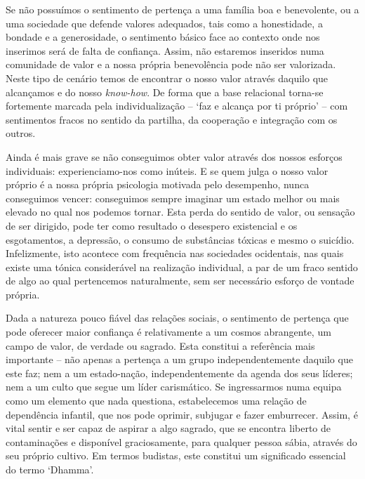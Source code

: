 Se não possuímos o sentimento de pertença a uma família boa e benevolente, ou a uma sociedade que defende valores adequados, tais como a honestidade, a bondade e a generosidade, o sentimento básico face ao contexto onde nos inserimos será de falta de confiança. Assim, não estaremos inseridos numa comunidade de valor e a nossa própria benevolência pode não ser valorizada. Neste tipo de cenário temos de encontrar o nosso valor através daquilo que alcançamos e do nosso \emph{know-how}. De forma que a base relacional torna-se fortemente marcada pela individualização -- `faz e alcança por ti próprio' -- com sentimentos fracos no sentido da partilha, da cooperação e integração com os outros.

Ainda é mais grave se não conseguimos obter valor através dos nossos esforços individuais: experienciamo-nos como inúteis. E se quem julga o nosso valor próprio é a nossa própria psicologia motivada pelo desempenho, nunca conseguimos vencer: conseguimos sempre imaginar um estado melhor ou mais elevado no qual nos podemos tornar. Esta perda do sentido de valor, ou sensação de ser dirigido, pode ter como resultado o desespero existencial e os esgotamentos, a depressão, o consumo de substâncias tóxicas e mesmo o suicídio. Infelizmente, isto acontece com frequência nas sociedades ocidentais, nas quais existe uma tónica considerável na realização individual, a par de um fraco sentido de algo ao qual pertencemos naturalmente, sem ser necessário esforço de vontade própria.

Dada a natureza pouco fiável das relações sociais, o sentimento de pertença que pode oferecer maior confiança é relativamente a um cosmos abrangente, um campo de valor, de verdade ou sagrado. Esta constitui a referência mais importante -- não apenas a pertença a um grupo independentemente daquilo que este faz; nem a um estado-nação, independentemente da agenda dos seus líderes; nem a um culto que segue um líder carismático. Se ingressarmos numa equipa como um elemento que nada questiona, estabelecemos uma relação de dependência infantil, que nos pode oprimir, subjugar e fazer emburrecer. Assim, é vital sentir e ser capaz de aspirar a algo sagrado, que se encontra liberto de contaminações e disponível graciosamente, para qualquer pessoa sábia, através do seu próprio cultivo. Em termos budistas, este constitui um significado essencial do termo `Dhamma'.

